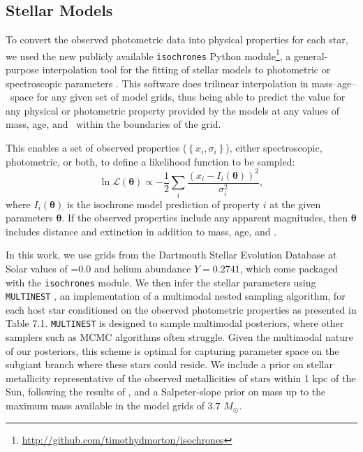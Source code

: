 \subsection{Stellar Models}
\label{sec:stellarparams}
To convert the observed photometric data into physical properties for each
star, we used the new publicly available \texttt{isochrones} Python module\footnote{
\url{http://github.com/timothydmorton/isochrones}}, a general-purpose
interpolation tool for the fitting of stellar models to photometric or spectroscopic
parameters \citep{Morton15a}.
This software does trilinear interpolation in mass--age--\feh\ space for any
given set of model grids, thus being able to predict the value for any
physical or photometric property provided by the models at any values of
mass, age, and \feh\ within the boundaries of the grid.

This enables a set of observed properties ($\left\{ x_i, \sigma_i \right\}$),
either spectroscopic, photometric,
or both, to define a likelihood function to be sampled:
\begin{equation}
\label{eq:ischochronelhood}
\ln \mathcal L(\boldsymbol{\theta}) \propto -\frac{1}{2} \displaystyle \sum_i \frac{\left(x_i -
  I_i\left(\boldsymbol{\theta} \right)\right)^2}{\sigma_i^2},
\end{equation}
where $I_i(\boldsymbol{\theta})$ is the isochrone model prediction of property
$i$ at the given parameters $\boldsymbol{\theta}$.
If the observed properties include any apparent magnitudes, then
$\boldsymbol{\theta}$ includes distance and extinction in addition
to mass, age, and \feh.

In this work, we use grids from the Dartmouth Stellar
Evolution Database \citep{Dotter08} at Solar values of \afe=$0.0$ and
helium abundance $Y=0.2741$, which come packaged with the \texttt{isochrones}
module.
We then infer the stellar parameters using \texttt{MULTINEST} \citep{Feroz09},
an implementation of a multimodal nested sampling algorithm,
for each host star conditioned on the observed
photometric properties as presented in Table 7.1.
\texttt{MULTINEST} is designed to sample multimodal posteriors, where other 
samplers such as MCMC algorithms often struggle. 
Given the multimodal nature of our posteriors, this scheme is optimal for 
capturing parameter space on the subgiant branch where these stars could reside.
We include a prior on stellar metallicity representative of the observed metallicities
of stars within 1 kpc of the Sun, following the results of \citet{Hayden15}, and a Salpeter-slope
prior on mass up to the maximum mass available in the model grids of $3.7$ $M_\odot$.

